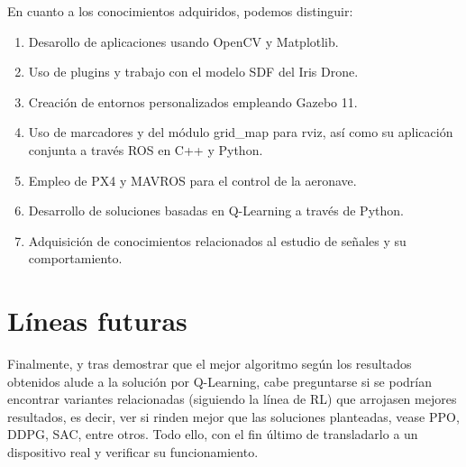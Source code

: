 En cuanto a los conocimientos adquiridos, podemos distinguir:

\begin{enumerate}
    \item Desarollo de aplicaciones usando OpenCV y Matplotlib.    
    \item Uso de plugins y trabajo con el modelo SDF del Iris Drone.    
    \item Creación de entornos personalizados empleando Gazebo 11.    
    \item Uso de marcadores y del módulo grid\_map para rviz, así como su aplicación conjunta a través ROS en C++ y Python.
    \item Empleo de PX4 y MAVROS para el control de la aeronave.    
    \item Desarrollo de soluciones basadas en Q-Learning a través de Python.    
    \item Adquisición de conocimientos relacionados al estudio de señales y su comportamiento.
\end{enumerate}

\section{Líneas futuras}
\label{sec:lineas_futuras}

Finalmente, y tras demostrar que el mejor algoritmo según los resultados obtenidos alude a la solución por Q-Learning, cabe preguntarse si se podrían encontrar variantes relacionadas (siguiendo la línea de \ac{RL}) que arrojasen mejores resultados, es decir, ver si rinden mejor que las soluciones planteadas, vease \ac{PPO}, \ac{DDPG}, \ac{SAC}, entre otros. Todo ello, con el fin último de transladarlo a un dispositivo real y verificar su funcionamiento.
